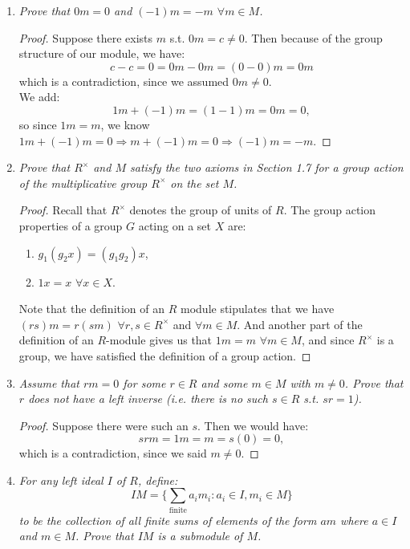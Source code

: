 \documentclass[12pt]{amsbook}
\theoremstyle{plain}
\numberwithin{section}{chapter}
\numberwithin{equation}{chapter}
\theoremstyle{definition}
\theoremstyle{remark}
\begin{document}
\begin{enumerate}[label=\arabic*.]
\item
\textit{Prove that $0m = 0$ and $(-1)m = -m$ $\forall m \in M$. }

\begin{proof}
Suppose there exists $m$ s.t. $0m = c \neq 0$. Then because of the group structure of our module, we have: 
$$
c - c = 0 = 0m - 0m = (0 - 0)m = 0m
$$
which is a contradiction, since we assumed $0m \neq 0$. \\
We add:
$$
1m + (-1)m = (1 - 1)m = 0m = 0,
$$
so since $1m = m$, we know $1m + (-1)m = 0 \Rightarrow m + (-1)m = 0 \Rightarrow (-1)m = -m$. 
\end{proof}



\item \textit{Prove that $R^\times$ and $M$ satisfy the two axioms in Section 1.7 for a group action of the multiplicative group $R^\times$ on the set $M$. }

\begin{proof}
Recall that $R^\times$ denotes the group of units of $R$. The group action properties of a group $G$ acting on a set $X$ are: 
\begin{enumerate}
\item $g_1(g_2x) = (g_1g_2)x$,
\item $1x = x$ $\forall x \in X$.
\end{enumerate}
Note that the definition of an $R$ module stipulates that we have $(rs)m = r(sm)$ $\forall r,s \in R^\times$ and $\forall m \in M$. And another part of the definition of an $R$-module gives us that $1m = m$ $\forall m \in M$, and since $R^\times$ is a group, we have satisfied the definition of a group action. 
\end{proof}
\vspace{20mm}
\item \textit{Assume that $rm = 0$ for some $r \in R$ and some $m \in M$ with $m \neq 0$. Prove that $r$ does not have a left inverse (i.e. there is no such $s \in R$ s.t. $sr = 1$). }
\begin{proof}
Suppose there were such an $s$. Then we would have:
$$
srm = 1m = m = s(0) = 0,
$$
which is a contradiction, since we said $m \neq 0$. 
\end{proof}
\vspace{3mm}
\setcounter{enumi}{4}
\item \textit{For any left ideal $I$ of $R$, define: 
$$
IM = \{\sum_{\text{finite}}a_im_i:a_i\in I, m_i \in M\}
$$
to be the collection of all finite sums of elements of the form $am$ where $a \in I$ and $m \in M$. Prove that $IM$ is a submodule of $M$. }


\end{enumerate}
\end{document}
